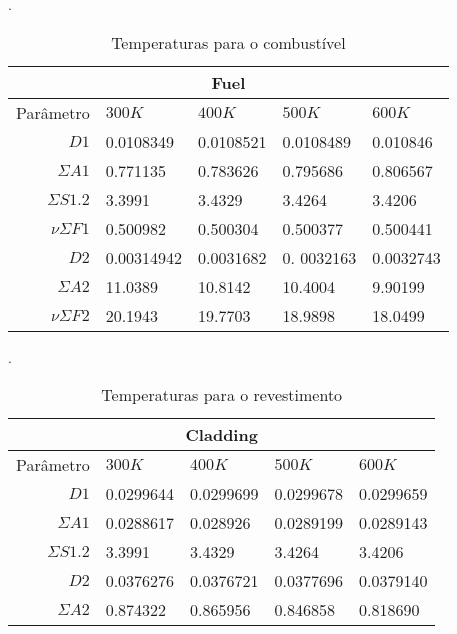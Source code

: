 \begin{table}[htb]
  \caption[Temperaturas para combustível.]{Temperaturas para o combustível}.
  \label{tab-temp-fuel}
  \begin{tabular}{r l l l l}
  \multicolumn{5}{c}{Fuel} \\
  \hline
  Parâmetro & $300K$ & $400K$ & $500K$ & $600K$ \\
  \hline
  $D1$ & 0.0108349 & 0.0108521 & 0.0108489 & 0.010846\\
  $\Sigma A1$ & 0.771135 & 0.783626 & 0.795686 & 0.806567\\
  $\Sigma S1.2$ & 3.3991 & 3.4329 & 3.4264 & 3.4206\\
  $\nu \Sigma F1$ & 0.500982 & 0.500304 & 0.500377 & 0.500441\\
  \hline
  $D2$ & 0.00314942 & 0.0031682 & 0. 0032163 & 0.0032743 \\
  $\Sigma A2$ & 11.0389 & 10.8142 & 10.4004 & 9.90199\\
  $\nu \Sigma F2$ & 20.1943 & 19.7703 & 18.9898 & 18.0499\\
  \hline
\end{tabular}
\end{table}

\begin{table}[htb]
  \caption[Temperaturas para o revestimento.]{Temperaturas para o revestimento}.
  \label{tab-temp-cladding}
  \begin{tabular}{r l l l l}
    \multicolumn{5}{c}{Cladding} \\
    \hline
    Parâmetro & $300K$ & $400K$ & $500K$ & $600K$ \\
    \hline
    $D1$ & 0.0299644 & 0.0299699 & 0.0299678 & 0.0299659 \\
    $\Sigma A1$ & 0.0288617 & 0.028926 & 0.0289199 & 0.0289143 \\
    $\Sigma S1.2$ & 3.3991 & 3.4329 & 3.4264 & 3.4206\\
    \hline
    $D2$ & 0.0376276 & 0.0376721 & 0.0377696 & 0.0379140\\
    $\Sigma A2$ & 0.874322 & 0.865956 & 0.846858 & 0.818690\\
    \hline
  \end{tabular}
\end{table}

